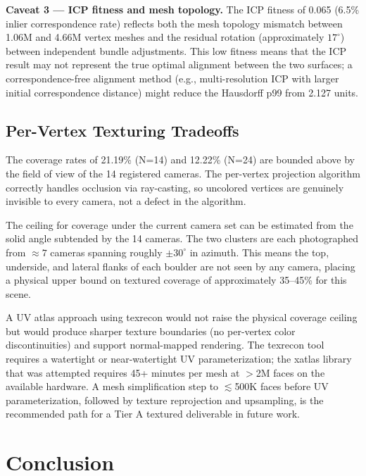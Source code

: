 \documentclass[12pt]{article}
\begin{document}
\textbf{Caveat 3 --- ICP fitness and mesh topology.} The ICP fitness of 0.065 (6.5\% inlier correspondence rate) reflects both the mesh topology mismatch between 1.06M and 4.66M vertex meshes and the residual rotation (approximately $17^\circ$) between independent bundle adjustments. This low fitness means that the ICP result may not represent the true optimal alignment between the two surfaces; a correspondence-free alignment method (e.g., multi-resolution ICP with larger initial correspondence distance) might reduce the Hausdorff p99 from 2.127 units.

\subsection{Per-Vertex Texturing Tradeoffs}

The coverage rates of 21.19\% (N=14) and 12.22\% (N=24) are bounded above by the field of view of the 14 registered cameras. The per-vertex projection algorithm correctly handles occlusion via ray-casting, so uncolored vertices are genuinely invisible to every camera, not a defect in the algorithm.

The ceiling for coverage under the current camera set can be estimated from the solid angle subtended by the 14 cameras. The two clusters are each photographed from $\approx 7$ cameras spanning roughly $\pm 30^\circ$ in azimuth. This means the top, underside, and lateral flanks of each boulder are not seen by any camera, placing a physical upper bound on textured coverage of approximately 35--45\% for this scene.

A UV atlas approach using texrecon would not raise the physical coverage ceiling but would produce sharper texture boundaries (no per-vertex color discontinuities) and support normal-mapped rendering. The texrecon tool requires a watertight or near-watertight UV parameterization; the xatlas library that was attempted requires 45+ minutes per mesh at $>$2M faces on the available hardware. A mesh simplification step to $\lesssim$500K faces before UV parameterization, followed by texture reprojection and upsampling, is the recommended path for a Tier A textured deliverable in future work.

\section{Conclusion}
\label{sec:conclusion}
\end{document}

